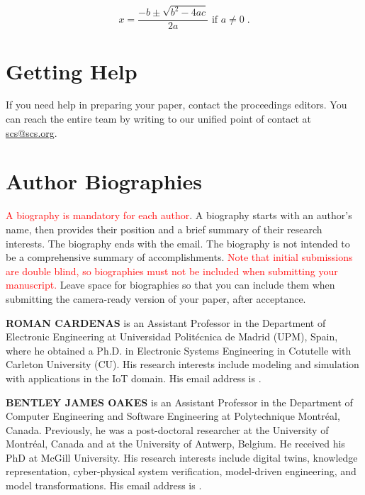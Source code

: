 \documentclass{scspaperproc}
\theoremstyle{scsthe}
\begin{document}
    \begin{equation} \label{eq:quadratic sol}
        x = \frac{-b \pm \sqrt{b^2-4ac}}{2a} \mbox{ if } a \ne 0\;.
    \end{equation}


    \section{Getting Help}
    If you need help in preparing your paper, contact the proceedings editors. You can reach the entire team by writing to our unified point of contact at \href{mailto://scs@scs.org}{scs@scs.org}.



    

    

    \section*{Author Biographies}

    \textcolor{red}{A biography is mandatory for each author}. A biography starts with an author's name, then provides their position and a brief summary of their research interests. The biography ends with the email. The biography is not intended to be a comprehensive summary of accomplishments. \textcolor{red}{Note that initial submissions are double blind, so biographies must not be included when submitting your manuscript.} Leave space for biographies so that you can include them when submitting the camera-ready version of your paper, after acceptance.

    \textbf{\uppercase{Roman Cardenas}} is an Assistant Professor in the Department of Electronic Engineering at Universidad Politécnica de Madrid (UPM), Spain, where he obtained a Ph.D. in Electronic Systems Engineering
    in Cotutelle with Carleton University (CU). His research interests include modeling and simulation with
    applications in the IoT domain. His email address is .

    \textbf{\uppercase{Bentley James Oakes}} is an Assistant Professor in the Department of Computer Engineering and Software Engineering at Polytechnique Montr\'{e}al, Canada. Previously, he was a post-doctoral researcher at the University of Montr\'{e}al, Canada and at the University of Antwerp, Belgium. He received his PhD at McGill University. His research interests include digital twins, knowledge representation, cyber-physical system verification, model-driven engineering, and model transformations. His email address is .
\end{document}
